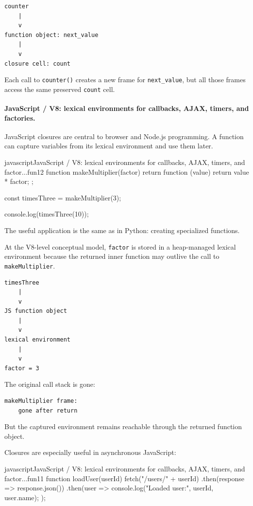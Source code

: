 \documentclass[a4paper,twoside]{report}
\begin{document}
\begin{verbatim}
counter
    |
    v
function object: next_value
    |
    v
closure cell: count
\end{verbatim}

Each call to \texttt{counter()} creates a new frame for \texttt{next\_value}, but all those frames access the same preserved \texttt{count} cell.

\paragraph{JavaScript / V8: lexical environments for callbacks, AJAX, timers, and factories.}

JavaScript closures are central to browser and Node.js programming. A function can capture variables from its lexical environment and use them later.

\begin{codebox}[]{javascript}{JavaScript / V8: lexical environments for callbacks, AJAX, timers, and factor...}{fun12}
function makeMultiplier(factor) {
    return function (value) {
        return value * factor;
    };
}

const timesThree = makeMultiplier(3);

console.log(timesThree(10));
\end{codebox}


The useful application is the same as in Python: creating specialized functions.

At the V8-level conceptual model, \texttt{factor} is stored in a heap-managed lexical environment because the returned inner function may outlive the call to \texttt{makeMultiplier}.

\begin{verbatim}
timesThree
    |
    v
JS function object
    |
    v
lexical environment
    |
    v
factor = 3
\end{verbatim}

The original call stack is gone:

\begin{verbatim}
makeMultiplier frame:
    gone after return
\end{verbatim}

But the captured environment remains reachable through the returned function object.

Closures are especially useful in asynchronous JavaScript:

\begin{codebox}[]{javascript}{JavaScript / V8: lexical environments for callbacks, AJAX, timers, and factor...}{fun11}
function loadUser(userId) {
    fetch("/users/" + userId)
        .then(response => response.json())
        .then(user => {
            console.log("Loaded user:", userId, user.name);
        });
}
\end{codebox}
\end{document}
